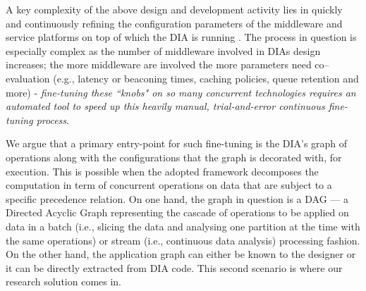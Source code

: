 A key complexity of the above design and development activity lies in quickly and continuously refining the configuration parameters of the middleware and service platforms on top of which the DIA is running \cite{wicsabd}. The process in question is especially complex as the number of middleware involved in DIAs design increases; the more middleware are involved the more parameters need co--evaluation (e.g., latency or beaconing times, caching policies, queue retention and more) - \emph{fine-tuning these ``knobs" on so many concurrent technologies requires an automated tool to speed up this heavily manual, trial-and-error continuous fine-tuning process}.

We argue that a primary entry-point for such fine-tuning is the DIA's graph of operations along with the configurations that the graph is decorated with, for execution. 
This is possible when the adopted framework decomposes the computation in term of concurrent operations on data that are subject to a specific precedence relation.
On one hand, the graph in question is a DAG --- a Directed Acyclic Graph representing the cascade of operations to be applied on data in a batch (i.e., slicing the data and analysing one partition at the time with the same operations) or stream (i.e., continuous data analysis) processing fashion. On the other hand, the application graph can either be known to the designer or it can be directly extracted from DIA code. This second scenario is where our research solution comes in.
%
